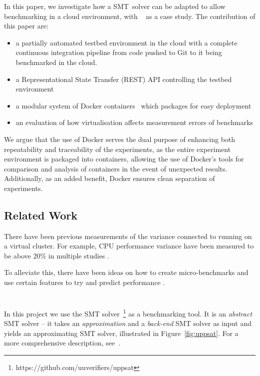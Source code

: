 \documentclass[a4paper]{IEEEtran}
\begin{document}

In this paper, we investigate how a SMT~solver can be adapted to allow
benchmarking in a cloud environment, with \uppsat{}~\cite{uppsat} as a
case study. The contribution of this paper are:

\begin{itemize}
  \item a partially automated testbed environment in the cloud with a
    complete continuous integration pipeline from code pushed to Git
    to it being benchmarked in the cloud.
    
  \item a Representational State Transfer (REST) API controlling the
    testbed environment
    
  \item a modular system of Docker containers~\cite{docker} which
    packages \uppsat{} for easy deployment

  \item an evaluation of how virtualisation affects measurement errors
    of benchmarks
\end{itemize}

We argue that the use of Docker serves the dual purpose of enhancing both
repeatability and traceability of the experiments, as the entire experiment
environment is packaged into containers, allowing the use of Docker's tools for
comparison and analysis of containers in the event of unexpected results.
Additionally, as an added benefit, Docker ensures clean separation of
experiments.

\subsection{Related Work}
There have been previous measurements of the variance connected to
running on a virtual cluster. For example, CPU performance variance
have been measured to be above 20\% in multiple studies
\cite{measurementCloud, sameCloud}.

To alleviate this, there have been ideas on how to create
micro-benchmarks and use certain features to try and predict
performance \cite{estimatingCloud}.


\section{\uppsat{}}
In this project we use the \uppsat{} SMT
solver~\footnote{https://github.com/uuverifiers/uppsat} as a
benchmarking tool. It is an \emph{abstract} SMT solver -- it takes an
\emph{approximation} and a \emph{back-end} SMT solver as input and
yields an approximating SMT solver, illustrated in
Figure~\ref{fig:uppsat}. For a more comprehensive description,
see~\cite{uppsat}.
\end{document}
